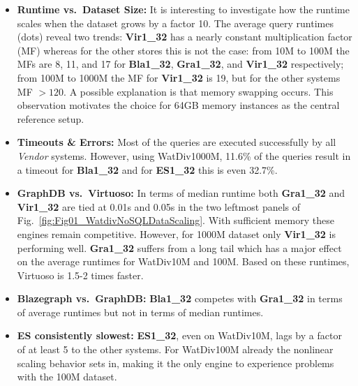 \begin{itemize}
	\item \textbf{Runtime vs.\ Dataset Size:} It is interesting to investigate how the runtime scales when the dataset grows by a factor 10. The average query runtimes (dots) reveal two trends: \textbf{Vir1\_32} has a nearly constant multiplication factor (MF) whereas for the other stores this is not the case: from 10M to 100M the MFs are 8, 11, and 17 for \textbf{Bla1\_32}, \textbf{Gra1\_32}, and \textbf{Vir1\_32} respectively; from 100M to 1000M the MF for \textbf{Vir1\_32} is 19, but for the other systems MF $> 120$. A possible explanation is that memory swapping occurs. This observation motivates the choice for 64GB memory instances as the central reference setup.
\item \textbf{Timeouts \& Errors:} Most of the queries are executed successfully by all \emph{Vendor} systems. However, using WatDiv1000M, 11.6\% of the queries result in a timeout for \textbf{Bla1\_32}  and for \textbf{ES1\_32} this is even 32.7\%. 

\item \textbf{GraphDB vs.\ Virtuoso:} In terms of median runtime both \textbf{Gra1\_32} and \textbf{Vir1\_32} are tied at 0.01s and 0.05s in the two leftmost panels of Fig.~\ref{fig:Fig01_WatdivNoSQLDataScaling}. With sufficient memory these engines remain competitive. However, for 1000M dataset only \textbf{Vir1\_32} is performing well. %
\textbf{Gra1\_32} suffers from a long tail which has a major effect on the average runtimes for WatDiv10M and 100M. Based on these runtimes, Virtuoso is 1.5-2 times faster.

\item \textbf{Blazegraph vs.\ GraphDB:} \textbf{Bla1\_32} competes with \textbf{Gra1\_32} in terms of average runtimes but not in terms of median runtimes.

\item \textbf{ES consistently slowest:} \textbf{ES1\_32}, even on WatDiv10M, lags by a factor of at least 5 to the other systems. For WatDiv100M already the nonlinear scaling behavior sets in, making it the only engine to experience problems with the 100M dataset. 
\end{itemize}
%
